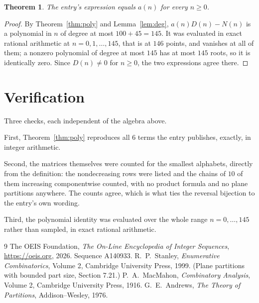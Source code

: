 \documentclass[11pt,a4paper]{article}
\theoremstyle{plain}
\newtheorem{theorem}{Theorem}
\theoremstyle{definition}
\begin{document}
\begin{theorem}
The entry's expression equals $a(n)$ for every $n\ge0$.
\end{theorem}

\begin{proof}
By Theorem~\ref{thm:poly} and Lemma~\ref{lem:deg}, $a(n)D(n)-N(n)$ is a polynomial in $n$
of degree at most $100+45=145$. It was evaluated in exact rational arithmetic at
$n=0,1,\dots,145$, that is at $146$ points, and vanishes at all of them; a nonzero polynomial
of degree at most $145$ has at most $145$ roots, so it is identically zero. Since $D(n)\neq0$
for $n\ge0$, the two expressions agree there.
\end{proof}

\section{Verification}

Three checks, each independent of the algebra above.

First, Theorem~\ref{thm:poly} reproduces all $6$ terms the entry publishes,
exactly, in integer arithmetic.

Second, the matrices themselves were counted for the smallest alphabets, directly from the
definition: the nondecreasing rows were listed and the chains of $10$ of them increasing
componentwise counted, with no product formula and no plane partitions anywhere. The counts
agree, which is what ties the reversal bijection to the entry's own wording.

Third, the polynomial identity was evaluated over the whole range $n=0,\dots,145$ rather than
sampled, in exact rational arithmetic.

\begin{thebibliography}{9}
 The OEIS Foundation, \emph{The On-Line Encyclopedia of Integer
Sequences}, \url{https://oeis.org}, 2026. Sequence A140933.
 R.~P.~Stanley, \emph{Enumerative Combinatorics}, Volume 2, Cambridge
University Press, 1999. (Plane partitions with bounded part size, Section 7.21.)
 P.~A.~MacMahon, \emph{Combinatory Analysis}, Volume 2, Cambridge
University Press, 1916.
 G.~E.~Andrews, \emph{The Theory of Partitions}, Addison--Wesley, 1976.
\end{thebibliography}
\end{document}
